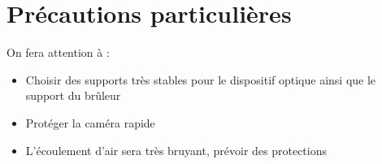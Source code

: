 \section{Précautions particulières}
 On fera attention à :
 
 \begin{itemize}
\item Choisir des supports très stables pour le dispositif optique ainsi que le support du brûleur
\item Protéger la caméra rapide
\item L'écoulement d'air sera très bruyant, prévoir des protections
\end{itemize}




